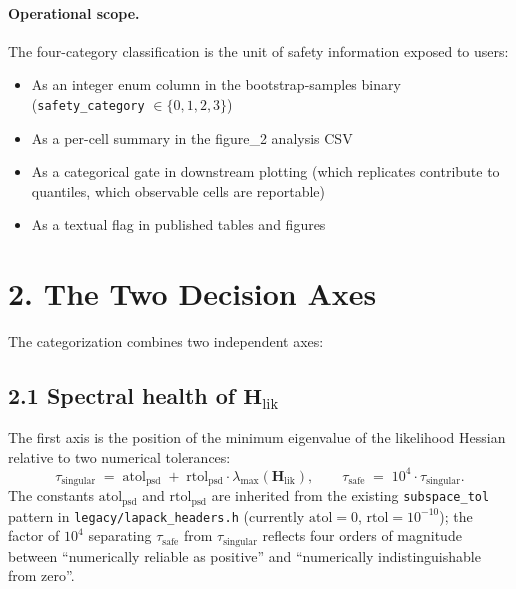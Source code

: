 \documentclass[11pt]{article}
\begin{document}
\paragraph{Operational scope.}
The four-category classification is the unit of safety information
exposed to users:
\begin{itemize}
\item As an integer enum column in the bootstrap-samples binary
  (\texttt{safety\_category} $\in \{0,1,2,3\}$)
\item As a per-cell summary in the figure\_2 analysis CSV
\item As a categorical gate in downstream plotting (which replicates
  contribute to quantiles, which observable cells are reportable)
\item As a textual flag in published tables and figures
\end{itemize}

\section*{2. The Two Decision Axes}
\label{sec:sc-two-axes}

The categorization combines two independent axes:

\subsection*{2.1 Spectral health of $\mathbf H_{\mathrm{lik}}$}
\label{sec:sc-spectral-axis}

The first axis is the position of the minimum eigenvalue of the
likelihood Hessian relative to two numerical tolerances:
\begin{equation}
\tau_{\mathrm{singular}}
\;=\;
\mathrm{atol}_{\mathrm{psd}} \;+\; \mathrm{rtol}_{\mathrm{psd}} \cdot \lambda_{\max}(\mathbf H_{\mathrm{lik}}),
\qquad
\tau_{\mathrm{safe}}
\;=\;
10^4 \cdot \tau_{\mathrm{singular}}.
\label{eq:sc-tolerances}
\end{equation}
The constants $\mathrm{atol}_{\mathrm{psd}}$ and $\mathrm{rtol}_{\mathrm{psd}}$
are inherited from the existing
\texttt{subspace\_tol} pattern in
\texttt{legacy/lapack\_headers.h} (currently $\mathrm{atol} = 0$,
$\mathrm{rtol} = 10^{-10}$); the factor of $10^4$ separating
$\tau_{\mathrm{safe}}$ from $\tau_{\mathrm{singular}}$ reflects four
orders of magnitude between ``numerically reliable as positive'' and
``numerically indistinguishable from zero''.
\end{document}
